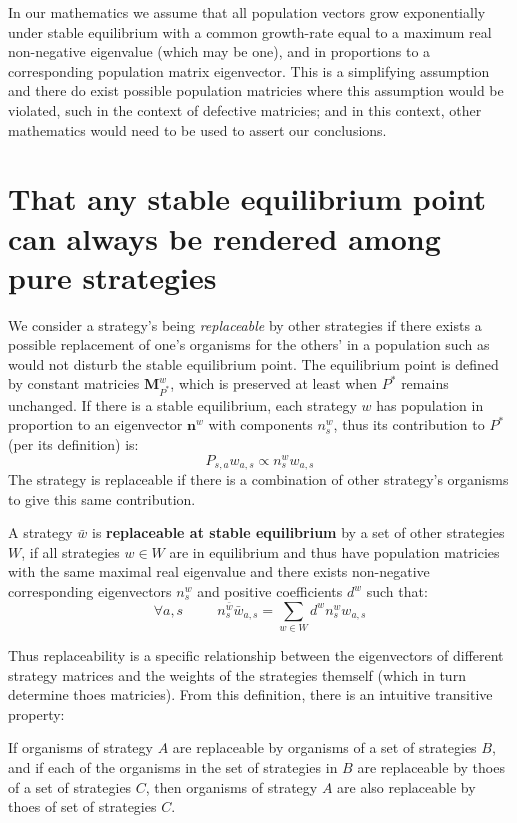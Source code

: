 In our mathematics we assume that all population vectors grow exponentially under stable equilibrium with a common growth-rate equal to a maximum real non-negative eigenvalue (which may be one), and in proportions to a corresponding population matrix eigenvector.
This is a simplifying assumption and there do exist possible population matricies where this assumption would be violated, such in the context of defective matricies; and in this context, other mathematics would need to be used to assert our conclusions.

\section{That any stable equilibrium point can always be rendered among pure strategies}\label{appendix5}
We consider a strategy's being \textit{replaceable} by other strategies if there exists a possible replacement of one's organisms for the others' in a population such as would not disturb the stable equilibrium point. The equilibrium point is defined by constant matricies $\mathbf{M}_{P^*}^w$, which is preserved at least when $P^*$ remains unchanged.
If there is a stable equilibrium, each strategy $w$ has population in proportion to an eigenvector $\mathbf{n}^w$ with components $n^w_s$, thus its contribution to $P^*$ (per its definition) is:
$$P_{s,a}w_{a,s} \propto n^w_sw_{a,s}$$
The strategy is replaceable if there is a combination of other strategy's organisms to give this same contribution.

\begin{Definition}\label{def1}
A strategy $\bar{w}$ is \textbf{replaceable at stable equilibrium} by a set of other strategies $W$, if all strategies $w\in W$ are in equilibrium and thus have population matricies with the same maximal real eigenvalue and there exists non-negative corresponding eigenvectors $n^w_s$ and positive coefficients $d^w$ such that:
$$\forall a,s~~~~~~~~~~~ n^{\bar{w}}_s\bar{w}_{a,s} = \sum_{w\in W}d^wn^w_sw_{a,s} $$
\end{Definition}

Thus replaceability is a specific relationship between the eigenvectors of different strategy matrices and the weights of the strategies themself (which in turn determine thoes matricies).
From this definition, there is an intuitive transitive property:

\begin{Definition}\label{def3}
If organisms of strategy $A$ are replaceable by organisms of a set of strategies $B$, and if each of the organisms in the set of strategies in $B$ are replaceable by thoes of a set of strategies $C$, then organisms of strategy $A$ are also replaceable by thoes of set of strategies $C$.
\end{Definition}

